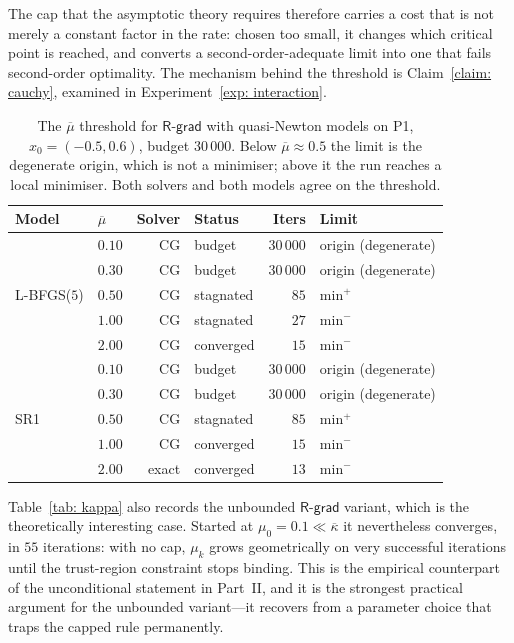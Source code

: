 \documentclass[11pt]{article}
\theoremstyle{plain}
\theoremstyle{definition}
\theoremstyle{remark}
\numberwithin{equation}{section}
\newcommand{\Rgrad}{\textsf{R-grad}}
\begin{document}
The cap that the asymptotic theory requires therefore carries a cost that is not merely a
constant factor in the rate: chosen too small, it changes which critical point is reached, and
converts a second-order-adequate limit into one that fails second-order optimality. The
mechanism behind the threshold is Claim~\ref{claim: cauchy}, examined in
Experiment~\ref{exp: interaction}.

\begin{table}[htbp]
  \centering
  \caption{The $\overline{\mu}$ threshold for $\Rgrad$ with quasi-Newton models on P1,
           $x_0 = (-0.5, 0.6)$, budget $30\,000$. Below $\overline{\mu} \approx 0.5$ the limit
           is the degenerate origin, which is not a minimiser; above it the run reaches a local
           minimiser. Both solvers and both models agree on the threshold.}
  \label{tab: mu threshold}
  \small
  \begin{tabular}{llrlrl}
    \toprule
    Model & $\overline{\mu}$ & Solver & Status & Iters & Limit \\
    \midrule
    \multirow{5}{*}{L-BFGS($5$)}
      & $0.10$ & CG    & budget    & $30\,000$ & origin (degenerate) \\
      & $0.30$ & CG    & budget    & $30\,000$ & origin (degenerate) \\
      & $0.50$ & CG    & stagnated & $85$      & $\text{min}^{+}$ \\
      & $1.00$ & CG    & stagnated & $27$      & $\text{min}^{-}$ \\
      & $2.00$ & CG    & converged & $15$      & $\text{min}^{-}$ \\
    \midrule
    \multirow{5}{*}{SR1}
      & $0.10$ & CG    & budget    & $30\,000$ & origin (degenerate) \\
      & $0.30$ & CG    & budget    & $30\,000$ & origin (degenerate) \\
      & $0.50$ & CG    & stagnated & $85$      & $\text{min}^{+}$ \\
      & $1.00$ & CG    & converged & $15$      & $\text{min}^{-}$ \\
      & $2.00$ & exact & converged & $13$      & $\text{min}^{-}$ \\
    \bottomrule
  \end{tabular}
\end{table}

Table~\ref{tab: kappa} also records the unbounded $\Rgrad$ variant, which is the theoretically
interesting case. Started at $\mu_0 = 0.1 \ll \overline{\kappa}$ it nevertheless converges, in
$55$ iterations: with no cap, $\mu_k$ grows geometrically on very successful iterations until
the trust-region constraint stops binding. This is the empirical counterpart of the unconditional
statement in Part~II, and it is the strongest practical argument for the unbounded variant---it
recovers from a parameter choice that traps the capped rule permanently.
\end{document}
